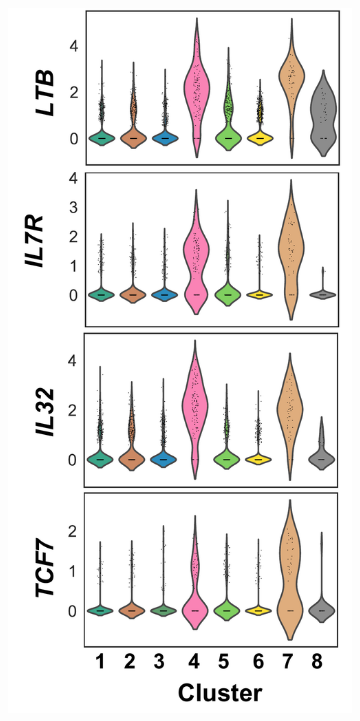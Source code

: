 \begin{figure}[H]
\begin{subfigure}[b]{0.35\textwidth}
		\centering
		\includegraphics[width=\textwidth]{./Results3/pdfs/PSA_monocytes_scanpy_single_cell_vln_plots_C4}
		\caption{}
	\end{subfigure}

\end{figure}
